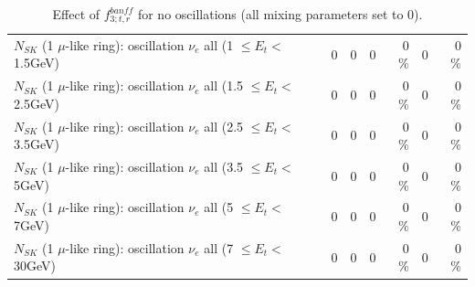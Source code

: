\begin{table}
\begin{tabular}{| l | r | r | r  r | r  r |}
$N_{SK}$ (1 $\mu$-like ring): oscillation $\nu_{e}$ all (1 $\leq E_{t} <$ 1.5GeV) &               0 &               0 &               0 &        0 \%  &               0 &        0 \%  \\ 
$N_{SK}$ (1 $\mu$-like ring): oscillation $\nu_{e}$ all (1.5 $\leq E_{t} <$ 2.5GeV) &               0 &               0 &               0 &        0 \%  &               0 &        0 \%  \\ 
$N_{SK}$ (1 $\mu$-like ring): oscillation $\nu_{e}$ all (2.5 $\leq E_{t} <$ 3.5GeV) &               0 &               0 &               0 &        0 \%  &               0 &        0 \%  \\ 
$N_{SK}$ (1 $\mu$-like ring): oscillation $\nu_{e}$ all (3.5 $\leq E_{t} <$ 5GeV) &               0 &               0 &               0 &        0 \%  &               0 &        0 \%  \\ 
 $N_{SK}$ (1 $\mu$-like ring): oscillation $\nu_{e}$ all (5 $\leq E_{t} <$ 7GeV) &               0 &               0 &               0 &        0 \%  &               0 &        0 \%  \\ 
$N_{SK}$ (1 $\mu$-like ring): oscillation $\nu_{e}$ all (7 $\leq E_{t} <$ 30GeV) &               0 &               0 &               0 &        0 \%  &               0 &        0 \%  \\ 
\hline
\hline
\end{tabular}
\caption{ Effect of $f_{3; t, r}^{banff}$ for no oscillations (all mixing parameters set to 0). }
\label{tab:num_banff_03_1RmuT_3f_osc_t13:0}
\end{table}
\clearpage
